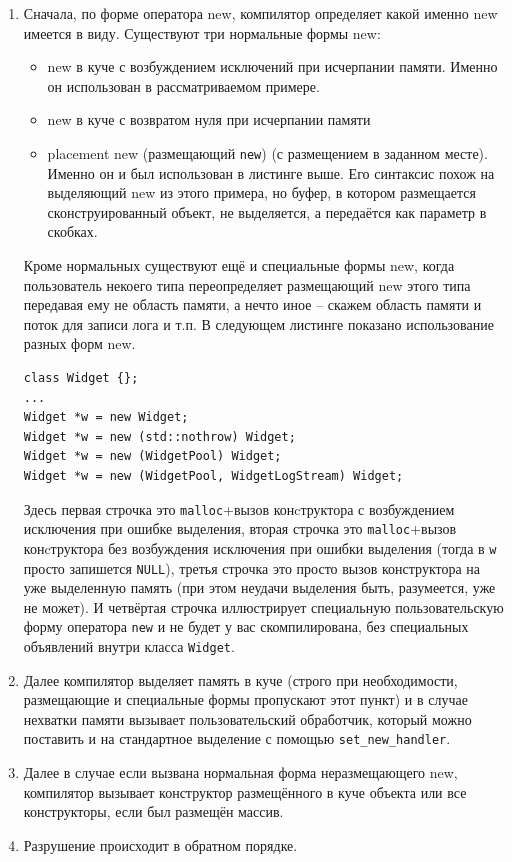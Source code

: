 \documentclass[a4paper,12pt,oneside]{article}
\begin{document}
\begin{enumerate}
\item
Сначала, по форме оператора new, компилятор определяет какой именно new имеется в виду. Существуют три нормальные формы new:
\begin{itemize}
\item
new в куче с возбуждением исключений при исчерпании памяти. Именно он использован в рассматриваемом примере.
\item
new в куче с возвратом нуля при исчерпании памяти
\item
placement new (размещающий \lstinline!new!) (с размещением в заданном месте). Именно он и был использован в листинге выше. Его синтаксис похож на выделяющий new из этого примера, но буфер, в котором размещается сконструированный объект, не выделяется, а передаётся как параметр в скобках.
\end{itemize}

Кроме нормальных существуют ещё и специальные формы new, когда пользователь некоего типа переопределяет размещающий new этого типа передавая ему не область памяти, а нечто иное -- скажем область памяти и поток для записи лога и т.п. В следующем листинге показано использование разных форм new.

\begin{lstlisting}
class Widget {};
...
Widget *w = new Widget;
Widget *w = new (std::nothrow) Widget;
Widget *w = new (WidgetPool) Widget;
Widget *w = new (WidgetPool, WidgetLogStream) Widget;
\end{lstlisting}

Здесь первая строчка это \lstinline!malloc!+вызов конcтруктора с возбуждением исключения при ошибке выделения, вторая строчка это \lstinline!malloc!+вызов конcтруктора без возбуждения исключения при ошибки выделения (тогда в \lstinline!w! просто запишется \lstinline!NULL!), третья строчка это просто вызов конструктора на уже выделенную память (при этом неудачи выделения быть, разумеется, уже не может). И четвёртая строчка иллюстрирует специальную пользовательскую форму оператора \lstinline!new! и не будет у вас скомпилирована, без специальных объявлений внутри класса \lstinline!Widget!.

\item
Далее компилятор выделяет память в куче (строго при необходимости, размещающие и специальные формы пропускают этот пункт) и в случае нехватки памяти вызывает пользовательский обработчик, который можно поставить и на стандартное выделение с помощью \lstinline!set_new_handler!.
\item
Далее в случае если вызвана нормальная форма неразмещающего new, компилятор вызывает конструктор размещённого в куче объекта или все конструкторы, если был размещён массив.
\item
Разрушение происходит в обратном порядке.
\end{enumerate}
\end{document}
